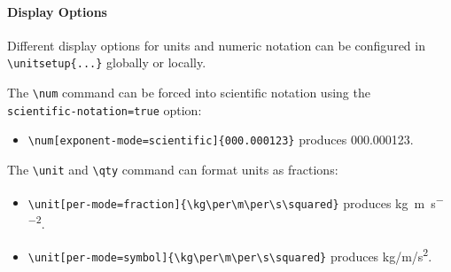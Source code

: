     \paragraph*{Display Options}

    Different display options for units and numeric notation can be configured in \\
     \verb|\unitsetup{...}| globally or locally.

    The \verb|\num| command can be forced into scientific notation using the\\
    \verb|scientific-notation=true| option:

    \begin{itemize}
        \item \verb|\num[exponent-mode=scientific]{000.000123}| produces \num[exponent-mode=scientific]{000.000123}.
    \end{itemize}

    The \verb|\unit| and \verb|\qty| command can format units as fractions:
    \begin{itemize}
        \item \verb|\unit[per-mode=fraction]{\kg\per\m\per\s\squared}| produces \unit[per-mode=fraction]{\kg\per\m\per\s\squared}.
        \item \verb|\unit[per-mode=symbol]{\kg\per\m\per\s\squared}| produces \unit[per-mode=symbol]{\kg\per\m\per\s\squared}.
    \end{itemize}


















\endgroup